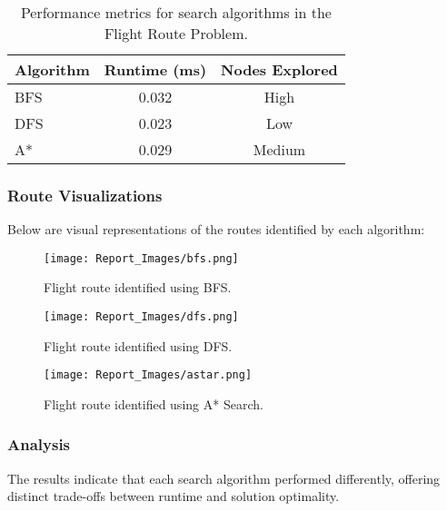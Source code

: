\documentclass[12pt]{article}
\begin{document}
\begin{table}[h!]
\centering
\begin{tabular}{|l|c|c|}
\hline
Algorithm & Runtime (ms) & Nodes Explored \\
\hline
BFS & 0.032 & High \\
DFS & 0.023 & Low \\
A* & 0.029 & Medium \\
\hline
\end{tabular}
\caption{Performance metrics for search algorithms in the Flight Route Problem.}
\label{tab:flight_route_performance}
\end{table}

\subsubsection{Route Visualizations}

Below are visual representations of the routes identified by each algorithm:

\begin{figure}[h!]
\centering
\texttt{[image: Report\_Images/bfs.png]}
\caption{Flight route identified using BFS.}
\label{fig:BFS}
\end{figure}

\begin{figure}[h!]
\centering
\texttt{[image: Report\_Images/dfs.png]}
\caption{Flight route identified using DFS.}
\label{fig:DFS}
\end{figure}

\begin{figure}[h!]
\centering
\texttt{[image: Report\_Images/astar.png]}
\caption{Flight route identified using A* Search.}
\label{fig:Astar}
\end{figure}

\newpage

\subsubsection{Analysis}

The results indicate that each search algorithm performed differently, offering distinct trade-offs between runtime and solution optimality.
\end{document}
